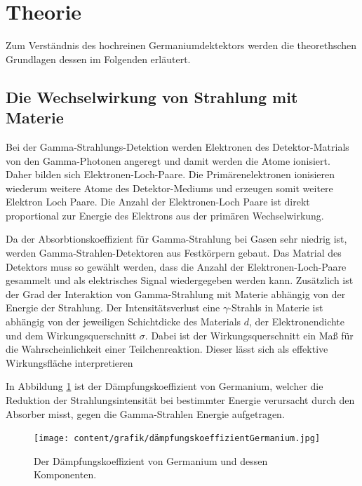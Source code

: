 \section[Theorie]{Theorie \textnormal{\cite{germanium}}}
\label{sec:theorie}

Zum Verständnis des hochreinen Germaniumdektektors werden die theorethschen Grundlagen dessen im Folgenden erläutert.

\subsection{Die Wechselwirkung von Strahlung mit Materie}
\label{sec:WW mit Materie}

Bei der Gamma-Strahlungs-Detektion werden Elektronen des Detektor-Matrials von den Gamma-Photonen angeregt und damit werden die 
Atome ionisiert. Daher bilden sich Elektronen-Loch-Paare. Die Primärenelektronen ionisieren wiederum weitere Atome des Detektor-Mediums und erzeugen somit weitere Elektron Loch Paare.
Die Anzahl der Elektronen-Loch Paare ist direkt proportional zur Energie des Elektrons aus der primären
Wechselwirkung.

Da der Absorbtionskoeffizient für Gamma-Strahlung bei Gasen sehr niedrig ist, 
werden Gamma-Strahlen-Detektoren aus Festkörpern gebaut. Das Matrial des Detektors muss so gewählt werden, dass
die Anzahl der Elektronen-Loch-Paare gesammelt und als elektrisches Signal wiedergegeben werden kann.
Zusätzlich ist der Grad der Interaktion von Gamma-Strahlung mit Materie abhängig von der Energie der Strahlung.
Der Intensitätsverlust  eine $\gamma$-Strahls in Materie ist abhängig von der jeweiligen Schichtdicke des Materials $d$,
der Elektronendichte und dem Wirkungsquerschnitt $\sigma$. Dabei ist der Wirkungsquerschnitt ein Maß für die Wahrscheinlichkeit einer Teilchenreaktion.
Dieser lässt sich als effektive Wirkungsfläche interpretieren

In Abbildung \ref{fig:koeffizient} ist der Dämpfungskoeffizient von Germanium, welcher die Reduktion der Strahlungsintensität
bei bestimmter Energie verursacht durch den Absorber misst, gegen die Gamma-Strahlen Energie aufgetragen.


\begin{figure}[H]
    \centering
    \texttt{[image: content/grafik/dämpfungskoeffizientGermanium.jpg]}
    \caption{Der Dämpfungskoeffizient von Germanium und dessen Komponenten. \cite{gamma_ray}}
    \label{fig:koeffizient}
\end{figure}

